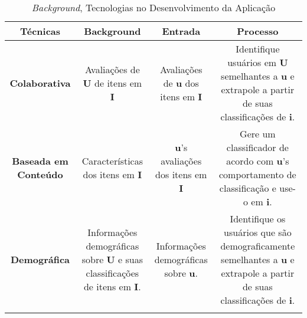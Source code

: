 \begin{table}[]
	\centering
	\caption{\emph{Background}, Tecnologias no Desenvolvimento da Aplicação}
	\label{tab12}
	\begin{tabular}{|c|c|c|c|}
	\hline
	\rowcolor[HTML]{C0C0C0} 
	\textbf{Técnicas} & \textbf{Background} & \textbf{Entrada}  &  \textbf{Processo}  \\ \hline
	\textbf{Colaborativa} & \begin{minipage} [t] {0.2\textwidth} \centering Avaliações de \textbf{U} de itens em \textbf{I}  \end{minipage}  & \begin{minipage} [t] {0.2\textwidth} \centering Avaliações de \textbf{u} dos itens em \textbf{I} \end{minipage}  &  \begin{minipage} [t] {0.2\textwidth}  Identifique usuários em \textbf{U} semelhantes a \textbf{u} e extrapole a partir de suas classificações de \textbf{i}.   \end{minipage}    \\ \hline
	\rowcolor[HTML]{EFEFEF} 
	\textbf{Baseada em Conteúdo} & \begin{minipage} [t] {0.2\textwidth} \centering Características dos itens em \textbf{I}\end{minipage}  & \begin{minipage} [t] {0.2\textwidth} \textbf{u}'s avaliações dos itens em \textbf{I} \end{minipage}  &   \begin{minipage} [t] {0.2\textwidth} Gere um classificador de acordo com \textbf{u}'s comportamento de classificação e use-o em \textbf{i}. \end{minipage} \\ \hline
	\textbf{Demográfica} & \begin{minipage} [t] {0.2\textwidth} \centering Informações demográficas sobre \textbf{U} e suas classificações de itens em \textbf{I}.    \end{minipage}   & \begin{minipage} [t] {0.2\textwidth} Informações demográficas sobre \textbf{u}. \end{minipage}  & \begin{minipage} [t] {0.2\textwidth} Identifique os usuários que são demograficamente semelhantes a \textbf{u} e extrapole a partir de suas classificações de \textbf{i}. \end{minipage}   \\ \hline
	\rowcolor[HTML]{EFEFEF} 

\end{tabular}
\end{table}
